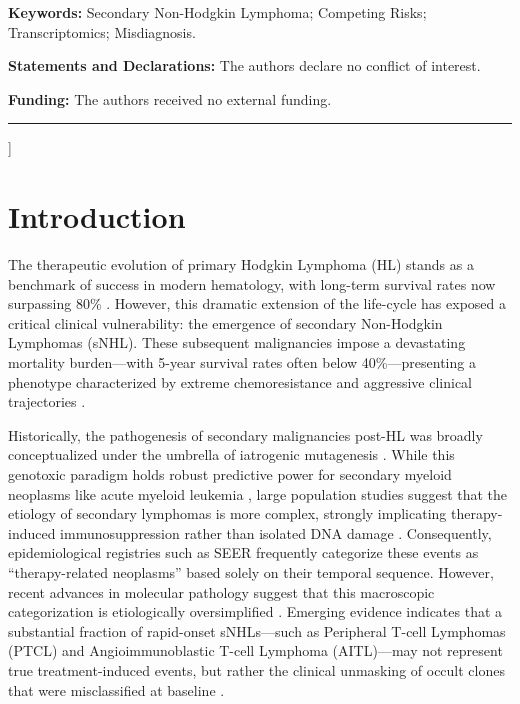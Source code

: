 \documentclass[a4paper,11pt,twocolumn]{article}
\begin{document}
\begin{@twocolumnfalse}
\begin{center}
\begin{minipage}{0.88\textwidth}
				\vspace{0.5cm}
				\noindent \textbf{Keywords:} Secondary Non-Hodgkin Lymphoma; Competing Risks; Transcriptomics; Misdiagnosis.
				\vspace{0.5cm}
				
				\noindent \textbf{Statements and Declarations:} The authors declare no conflict of interest.
				\vspace{0.5cm}
				
				\noindent \textbf{Funding:} The authors received no external funding.
			\end{minipage}
		\end{center}
		\vspace{0.8cm}
		\hrule
		\vspace{0.8cm}
	\end{@twocolumnfalse}
	]
	\makeatother
	
	
	\section{Introduction}
	
	The therapeutic evolution of primary Hodgkin Lymphoma (HL) stands as a benchmark of success in modern hematology, with long-term survival rates now surpassing 80\% \cite{Ansell2015, Schaapveld2015}. However, this dramatic extension of the life-cycle has exposed a critical clinical vulnerability: the emergence of secondary Non-Hodgkin Lymphomas (sNHL). These subsequent malignancies impose a devastating mortality burden—with 5-year survival rates often below 40\%—presenting a phenotype characterized by extreme chemoresistance and aggressive clinical trajectories \cite{Eichenauer2021}.
	
	Historically, the pathogenesis of secondary malignancies post-HL was broadly conceptualized under the umbrella of iatrogenic mutagenesis \cite{Morton2013}. While this genotoxic paradigm holds robust predictive power for secondary myeloid neoplasms like acute myeloid leukemia \cite{Morton2013}, large population studies suggest that the etiology of secondary lymphomas is more complex, strongly implicating therapy-induced immunosuppression rather than isolated DNA damage \cite{Schaapveld2015}. Consequently, epidemiological registries such as SEER frequently categorize these events as ``therapy-related neoplasms'' based solely on their temporal sequence. However, recent advances in molecular pathology suggest that this macroscopic categorization is etiologically oversimplified \cite{Alaggio2022}. Emerging evidence indicates that a substantial fraction of rapid-onset sNHLs—such as Peripheral T-cell Lymphomas (PTCL) and Angioimmunoblastic T-cell Lymphoma (AITL)—may not represent true treatment-induced events, but rather the clinical unmasking of occult clones that were misclassified at baseline \cite{Swerdlow2016, Alaggio2022}.
	
\end{document}
